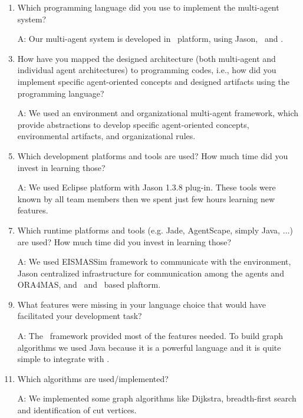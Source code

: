 \begin{enumerate}
\item Which programming language did you use to implement the multi-agent system?
	\item[A:] Our multi-agent system is developed in \jacamo\ platform, using Jason, \cartago\ and \moise.\\
	
\item How have you mapped the designed architecture (both multi-agent and individual agent architectures) to programming codes, i.e., how did you implement specific agent-oriented concepts and designed  artifacts using the programming language?
	\item[A:] We used an environment and organizational multi-agent framework, which provide abstractions to develop specific agent-oriented concepts, environmental artifacts, and organizational rules. \\
	
\item Which development platforms and tools are used? How much time did you invest in learning those?
	\item[A:] We used Eclipse platform with Jason 1.3.8 plug-in. These tools were known by all team members then we spent just few hours learning new features.\\
	
\item Which runtime platforms and tools (e.g. Jade, AgentScape, simply Java, $\ldots$) are used? How much time did you invest in learning those?
	\item[A:] We used EISMASSim framework to communicate with the environment, Jason centralized infrastructure for communication among the agents and ORA4MAS, and \cartago\ and \moise\ based plaftorm. \\
	
\item What features were missing in your language choice that would have facilitated your development task?
	\item[A:] The \jacamo\ framework provided most of the features needed. To build graph algorithms we used Java because it is a powerful language and it is quite simple to integrate with \jacamo.\\
	
\item Which algorithms are used/implemented?
	\item[A:] We implemented some graph algorithms like Dijkstra, breadth-first search and identification of cut vertices.\\
	

\end{enumerate}
